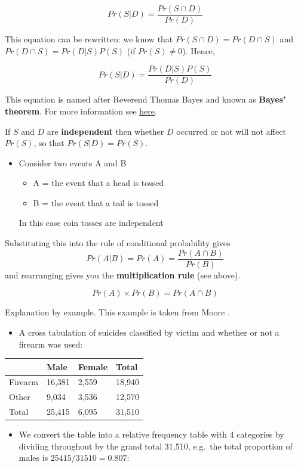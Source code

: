 \documentclass[
  oneside]{krantz}
\providecommand{\tightlist}{%
  \setlength{\itemsep}{0pt}\setlength{\parskip}{0pt}}
\begin{document}
\[Pr(S|D) = \frac{Pr(S \cap D)}{Pr(D)}\]

This equation can be rewritten: we know that \(Pr(S \cap D) = Pr(D \cap S)\) and \(Pr(D \cap S) = Pr(D|S)P(S)\) (if \(Pr(S) \ne 0\)). Hence,

\[Pr(S|D) = \frac{Pr(D|S)P(S)}{Pr(D)}\]

This equation is named after Reverend Thomas Bayes and known as \textbf{Bayes' theorem}. For more information see \href{https://betterexplained.com/articles/an-intuitive-and-short-explanation-of-bayes-theorem/}{here}.

If \(S\) and \(D\) are \textbf{independent} then whether \(D\) occurred or not will not affect \(Pr(S)\), so that \(Pr(S|D) = Pr(S)\).

\begin{itemize}
\item
  Consider two events A and B

  \begin{itemize}
  \tightlist
  \item
    A = the event that a head is tossed
  \item
    B = the event that a tail is tossed
  \end{itemize}

  In this case coin tosses are independent
\end{itemize}

Substituting this into the rule of conditional probability gives
\[Pr(A|B) = Pr(A) = \frac{Pr(A \cap B)} {Pr(B)}\]
and rearranging gives you the \textbf{multiplication rule} (see above).

\[ Pr(A) \times Pr(B) = Pr(A \cap B) \]

Explanation by example. This example is taken from Moore \citeyearpar{Moore1992}.

\begin{itemize}
\tightlist
\item
  A cross tabulation of suicides classified by victim and whether or not a firearm was used:
\end{itemize}

\begin{longtable}[]{@{}llll@{}}
\toprule
& Male & Female & Total\tabularnewline
\midrule
\endhead
Firearm & 16,381 & 2,559 & 18,940\tabularnewline
Other & 9,034 & 3,536 & 12,570\tabularnewline
Total & 25,415 & 6,095 & 31,510\tabularnewline
\bottomrule
\end{longtable}

\begin{itemize}
\tightlist
\item
  We convert the table into a relative frequency table with 4 categories by dividing throughout by the grand total 31,510, e.g.~the total proportion of males is \(25415/31510 = 0.807\):
\end{itemize}
\end{document}
